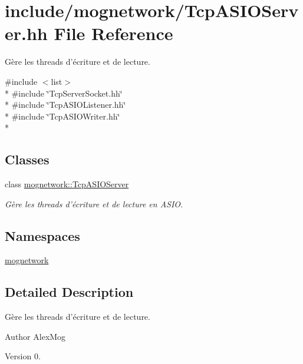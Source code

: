 \hypertarget{_tcp_a_s_i_o_server_8hh}{\section{include/mognetwork/\-Tcp\-A\-S\-I\-O\-Server.hh File Reference}
\label{_tcp_a_s_i_o_server_8hh}
}


Gère les threads d'écriture et de lecture.  


{\ttfamily \#include $<$list$>$}\\*
{\ttfamily \#include \char`\"{}Tcp\-Server\-Socket.\-hh\char`\"{}}\\*
{\ttfamily \#include \char`\"{}Tcp\-A\-S\-I\-O\-Listener.\-hh\char`\"{}}\\*
{\ttfamily \#include \char`\"{}Tcp\-A\-S\-I\-O\-Writer.\-hh\char`\"{}}\\*
\subsection*{Classes}
\begin{DoxyCompactItemize}
\item 
class \hyperlink{classmognetwork_1_1_tcp_a_s_i_o_server}{mognetwork\-::\-Tcp\-A\-S\-I\-O\-Server}
\begin{DoxyCompactList}\small\item\em Gère les threads d'écriture et de lecture en A\-S\-I\-O. \end{DoxyCompactList}\end{DoxyCompactItemize}
\subsection*{Namespaces}
\begin{DoxyCompactItemize}
\item 
\hyperlink{namespacemognetwork}{mognetwork}
\end{DoxyCompactItemize}


\subsection{Detailed Description}
Gère les threads d'écriture et de lecture. \begin{DoxyAuthor}{Author}
Alex\-Mog 
\end{DoxyAuthor}
\begin{DoxyVersion}{Version}
0. 
\end{DoxyVersion}

